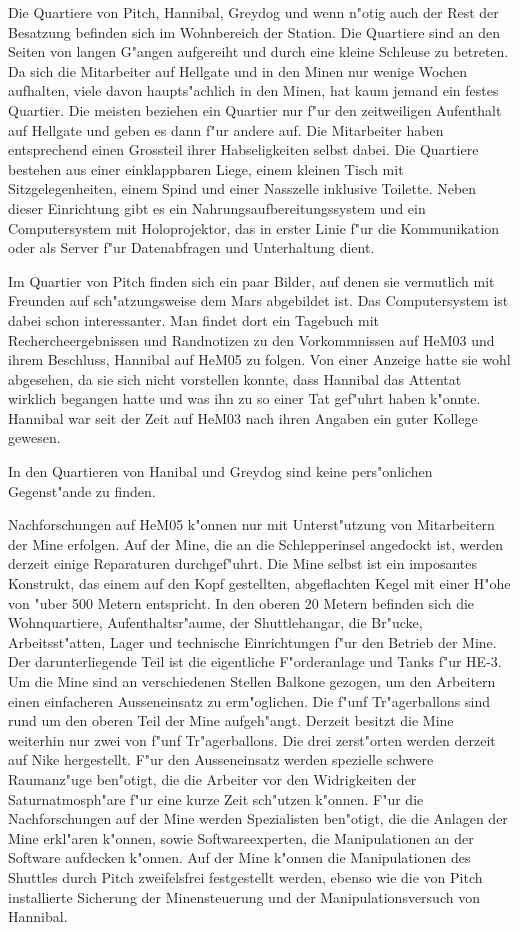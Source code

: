 Die Quartiere von Pitch, Hannibal, Greydog und wenn n"otig auch der Rest der Besatzung befinden sich im Wohnbereich der Station. Die Quartiere sind an den Seiten von langen G"angen aufgereiht und durch eine kleine Schleuse zu betreten. Da sich die Mitarbeiter auf Hellgate und in den Minen nur wenige Wochen aufhalten, viele davon haupts"achlich in den Minen, hat kaum jemand ein festes Quartier. Die meisten beziehen ein Quartier nur f"ur den zeitweiligen Aufenthalt auf Hellgate und geben es dann f"ur andere auf. Die Mitarbeiter haben entsprechend einen Grossteil ihrer Habseligkeiten selbst dabei. Die Quartiere bestehen aus einer einklappbaren Liege, einem kleinen Tisch mit Sitzgelegenheiten, einem Spind und einer Nasszelle inklusive Toilette. Neben dieser Einrichtung gibt es ein Nahrungsaufbereitungssystem und ein Computersystem mit Holoprojektor, das in erster Linie f"ur die Kommunikation oder als Server f"ur Datenabfragen und Unterhaltung dient.

Im Quartier von Pitch finden sich ein paar Bilder, auf denen sie vermutlich mit Freunden auf sch"atzungsweise dem Mars abgebildet ist. Das Computersystem ist dabei schon interessanter. Man findet dort ein Tagebuch mit Rechercheergebnissen und Randnotizen zu den Vorkommnissen auf HeM03 und ihrem Beschluss, Hannibal auf HeM05 zu folgen. Von einer Anzeige hatte sie wohl abgesehen, da sie sich nicht vorstellen konnte, dass Hannibal das Attentat wirklich begangen hatte und was ihn zu so einer Tat gef"uhrt haben k"onnte. Hannibal war seit der Zeit auf HeM03 nach ihren Angaben ein guter Kollege gewesen.


In den Quartieren von Hanibal und Greydog sind keine pers"onlichen Gegenst"ande zu finden.

Nachforschungen auf HeM05 k"onnen nur mit Unterst"utzung von Mitarbeitern der Mine erfolgen. Auf der Mine, die an die Schlepperinsel angedockt ist, werden derzeit einige Reparaturen durchgef"uhrt. Die Mine selbst ist ein imposantes Konstrukt, das einem auf den Kopf gestellten, abgeflachten Kegel mit einer H"ohe von "uber 500 Metern entspricht. In den oberen 20 Metern befinden sich die Wohnquartiere, Aufenthaltsr"aume, der Shuttlehangar, die Br"ucke, Arbeitsst"atten, Lager und technische Einrichtungen f"ur den Betrieb der Mine. Der darunterliegende Teil ist die eigentliche F"orderanlage und Tanks f"ur HE-3. Um die Mine sind an verschiedenen Stellen Balkone gezogen, um den Arbeitern einen einfacheren Ausseneinsatz zu erm"oglichen. Die f"unf Tr"agerballons sind rund um den oberen Teil der Mine aufgeh"angt. Derzeit besitzt die Mine weiterhin nur zwei von f"unf Tr"agerballons. Die drei zerst"orten werden derzeit auf Nike hergestellt. F"ur den Ausseneinsatz werden spezielle schwere Raumanz"uge ben"otigt, die die Arbeiter vor den Widrigkeiten der Saturnatmosph"are f"ur eine kurze Zeit sch"utzen k"onnen. F"ur die Nachforschungen auf der Mine werden Spezialisten ben"otigt, die die Anlagen der Mine erkl"aren k"onnen, sowie Softwareexperten, die Manipulationen an der Software aufdecken k"onnen. Auf der Mine k"onnen die Manipulationen des Shuttles durch Pitch zweifelsfrei festgestellt werden, ebenso wie die von Pitch installierte Sicherung der Minensteuerung und der Manipulationsversuch von Hannibal.
